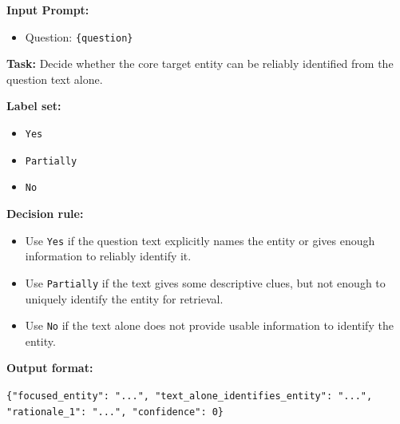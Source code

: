 \documentclass{article} %
\begin{document}
\begin{tcolorbox}[
  title=Example: $C_1$ Text-Alone Entity Identification Prompt,
  coltitle=black,
  colbacktitle=blue!8,
  colback=blue!5,
  colframe=black,
  fonttitle=\bfseries,
  arc=2mm,
  boxrule=0.5pt,
  enhanced jigsaw,
  breakable,
  width=\linewidth,
  left=6pt,
  right=6pt,
  top=6pt,
  bottom=6pt
]

\textbf{Input Prompt:}

\begin{itemize}
  \item Question: \texttt{\{question\}}
\end{itemize}

\textbf{Task:}
Decide whether the core target entity can be reliably identified from the question text alone.

\textbf{Label set:}
\begin{itemize}
  \item \texttt{Yes}
  \item \texttt{Partially}
  \item \texttt{No}
\end{itemize}

\textbf{Decision rule:}
\begin{itemize}
  \item Use \texttt{Yes} if the question text explicitly names the entity or gives enough information to reliably identify it.
  \item Use \texttt{Partially} if the text gives some descriptive clues, but not enough to uniquely identify the entity for retrieval.
  \item Use \texttt{No} if the text alone does not provide usable information to identify the entity.
\end{itemize}

\textbf{Output format:}

\verb|{"focused_entity": "...", "text_alone_identifies_entity": "...", "rationale_1": "...", "confidence": 0}|
\end{tcolorbox}
\end{document}
